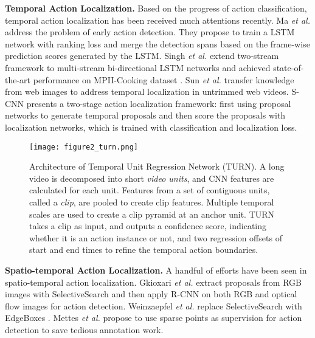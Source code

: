 \documentclass[10pt,twocolumn,letterpaper]{article}
\begin{document}
\textbf{Temporal Action Localization.} Based on the progress of action classification, temporal action localization has been received much attentions recently. Ma \emph{et al.} \cite{Ma_2016_CVPR}  address the problem of early action detection. They propose to train a LSTM network with ranking loss and merge the detection spans based on the frame-wise prediction scores generated by the LSTM. Singh \emph{et al.} \cite{Singh_2016_CVPR} extend two-stream \cite{simonyan2014two} framework to multi-stream bi-directional LSTM networks and achieved state-of-the-art performance on MPII-Cooking dataset \cite{rohrbach2012database}. Sun \emph{et al.} \cite{sun2015temporal} transfer knowledge from web images to address temporal localization in untrimmed web videos. S-CNN \cite{Shou_2016_CVPR} presents a two-stage action localization framework: first using proposal networks to generate temporal proposals and then score the proposals with localization networks, which is trained with classification and localization loss.

\begin{figure*}
\centering
\texttt{[image: figure2\_turn.png]}
\caption{ Architecture of Temporal Unit Regression Network (TURN). A long video is decomposed into short \emph{video units}, and CNN features are calculated for each unit. Features from a set of contiguous units, called a \emph{clip}, are pooled to create clip features. Multiple temporal scales are used to create a clip pyramid at an anchor unit. TURN takes a clip as input, and outputs a confidence score, indicating whether it is an action instance or not, and two regression offsets of start and end times to refine the temporal action boundaries.}
\end{figure*}

\textbf{Spatio-temporal Action Localization.}
A handful of efforts have been seen in spatio-temporal action localization. Gkioxari \emph{et al.} \cite{gkioxari2015finding} extract proposals from RGB images with SelectiveSearch \cite{uijlings2013selective} and then apply R-CNN \cite{Girshick_2014_CVPR} on both RGB and optical flow images for action detection. Weinzaepfel \emph{et al.} \cite{weinzaepfel2015learning} replace SelectiveSearch \cite{uijlings2013selective} with EdgeBoxes
\cite{zitnick2014edge}. Mettes \emph{et al.} \cite{mettes2016spot} propose to use sparse points as supervision for action detection to save tedious annotation work.
\end{document}
